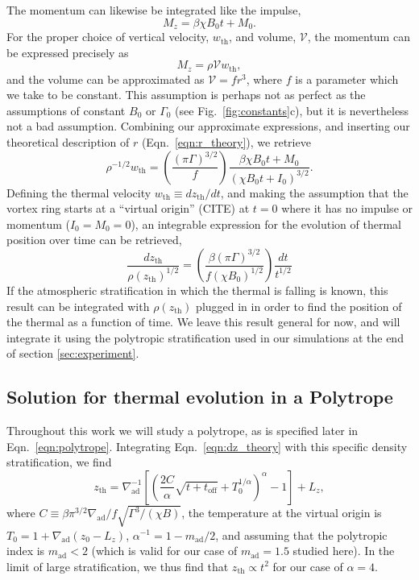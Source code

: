 \documentclass[twocolumn, amsmath, amsfonts, amssymb, trackchanges]{aastex62}
\newcommand{\grad}{\ensuremath{\nabla}}
\begin{document}
The momentum can likewise be integrated like the impulse,
\begin{equation*}
M_z = \beta\chi B_0 t + M_0.
\end{equation*}
For the proper choice of vertical velocity, $w_{\text{th}}$, and volume, $\mathcal{V}$, the momentum can be expressed precisely as 
\begin{equation*}
M_z = \rho \mathcal{V} w_{\text{th}},
\end{equation*}
and the volume can be approximated as $\mathcal{V} = f r^3$, where $f$ is a parameter which we take to be constant. 
This assumption is perhaps not as perfect as the assumptions of constant $B_0$ or $\Gamma_0$ (see Fig.~\ref{fig:constants}c), but it is nevertheless not a bad assumption. 
Combining our approximate expressions, and inserting our theoretical description of $r$ (Eqn.~\ref{eqn:r_theory}), we retrieve
\begin{equation}
\rho^{-1/2} w_{\text{th}} = \left(\frac{(\pi \Gamma)^{3/2}}{f}\right)\frac{\beta\chi B_0 t + M_0}{(\chi B_0 t + I_0)^{3/2}}.
\end{equation}
Defining the thermal velocity $w_{\text{th}} \equiv dz_{\text{th}}/dt$, and making the assumption that the vortex ring starts at a ``virtual origin'' (CITE) at $t = 0$ where it has no impulse or momentum ($I_0 = M_0 = 0$), an integrable expression for the evolution of thermal position over time can be retrieved,
\begin{equation}
\frac{dz_{\text{th}}}{\rho(z_{\text{th}})^{1/2}} =
\left(\frac{\beta(\pi\Gamma)^{3/2}}{f(\chi B_0)^{1/2}}\right)\frac{dt}{t^{1/2}}
\label{eqn:dz_theory}
\end{equation}
If the atmospheric stratification in which the thermal is falling is known, this result can be integrated with $\rho(z_{\text{th}})$ plugged in in order to find the position of the thermal as a function of time. 
We leave this result general for now, and will integrate it using the polytropic stratification used in our simulations at the end of section \ref{sec:experiment}.

\subsection{Solution for thermal evolution in a Polytrope}
Throughout this work we will study a polytrope, as is specified later in Eqn.~\ref{eqn:polytrope}.
Integrating Eqn.~\ref{eqn:dz_theory} with this specific density stratification, we find
\begin{equation}
z_{\text{th}} = \grad_{\text{ad}}^{-1}\left[\left(\frac{2C}{ \alpha } \sqrt{t + t_{\text{off}}} + T_0^{1/\alpha}  \right)^{\alpha} - 1\right] + L_z,
\label{eqn:theory_z}
\end{equation}
where $C \equiv \beta \pi^{3/2} \grad_{\text{ad}} / f \sqrt{\Gamma^3/(\chi B)}$, the temperature at the virtual origin is $T_0 = 1 + \grad_{\text{ad}}(z_0 - L_z)$, $\alpha^{-1} = 1 - m_{\text{ad}}/2$, and assuming that the polytropic index is $m_{\text{ad}} < 2$ (which is valid for our case of $m_{\text{ad}} = 1.5$ studied here).
In the limit of large stratification, we thus find that $z_{\text{th}} \propto t^2$ for our case of $\alpha = 4$. 
\end{document}
